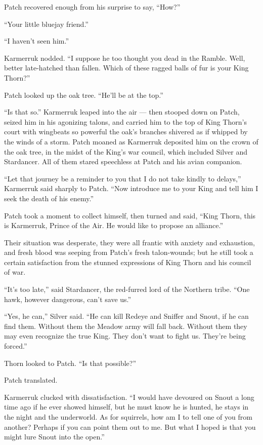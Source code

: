 \documentclass[ebook,oneside,openany,17pt]{memoir}
\begin{document}
Patch recovered enough from his surprise to say, “How?”

“Your little bluejay friend.”

“I haven’t seen him.”

Karmerruk nodded. “I suppose he too thought you dead in the
Ramble. Well, better late-hatched than fallen. Which of these ragged
balls of fur is your King Thorn?”

Patch looked up the oak tree. “He’ll be at the top.”

“Is that so.” Karmerruk leaped into the air — then stooped down on
Patch, seized him in his agonizing talons, and carried him to the top
of King Thorn’s court with wingbeats so powerful the oak’s branches
shivered as if whipped by the winds of a storm. Patch moaned as
Karmerruk deposited him on the crown of the oak tree, in the midst of
the King’s war council, which included Silver and Stardancer. All of
them stared speechless at Patch and his avian companion.

“Let that journey be a reminder to you that I do not take kindly to
delays,” Karmerruk said sharply to Patch. “Now introduce me to your
King and tell him I seek the death of his enemy.”

Patch took a moment to collect himself, then turned and said, “King
Thorn, this is Karmerruk, Prince of the Air. He would like to propose
an alliance.”

Their situation was desperate, they were all frantic with anxiety and
exhaustion, and fresh blood was seeping from Patch’s fresh
talon-wounds; but he still took a certain satisfaction from the
stunned expressions of King Thorn and his council of war.

“It’s too late,” said Stardancer, the red-furred lord of the Northern
tribe. “One hawk, however dangerous, can’t save us.”

“Yes, he can,” Silver said. “He can kill Redeye and Sniffer and Snout,
if he can find them. Without them the Meadow army will fall
back. Without them they may even recognize the true King. They don’t
want to fight us. They’re being forced.”

Thorn looked to Patch. “Is that possible?”

Patch translated.

Karmerruk clucked with dissatisfaction. “I would have devoured on
Snout a long time ago if he ever showed himself, but he must know he
is hunted, he stays in the night and the underworld. As for squirrels,
how am I to tell one of you from another? Perhaps if you can point
them out to me. But what I hoped is that you might lure Snout into the
open.”
\end{document}
